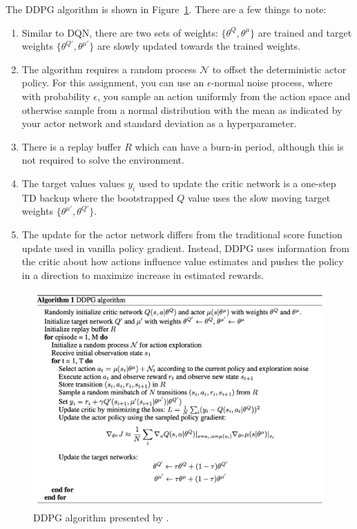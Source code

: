 \documentclass[12pt]{article}
\begin{document}
The DDPG algorithm is shown in Figure~\ref{fig:ddpg}.
There are a few things to note:
\begin{enumerate}
    \item Similar to DQN, there are two sets of weights: $\{\theta^{Q},\theta^\mu\}$ are trained and target weights $\{\theta^{Q'}, \theta^{\mu'}\}$ are slowly updated towards the trained weights.  
    \item The algorithm requires a random process $\mathcal{N}$ to offset the deterministic actor policy.  For this assignment, you can use an $\epsilon$-normal noise process, where with probability $\epsilon$, you sample an action uniformly from the action space and otherwise sample from a normal distribution with the mean as indicated by your actor network and standard deviation as a hyperparameter.  
    \item There is a replay buffer $R$ which can have a burn-in period, although this is not required to solve the environment.
    \item The target values values $y_i$ used to update the critic network is a one-step TD backup where the bootstrapped $Q$ value uses the slow moving target weights $\{\theta^{\mu'},\theta^{Q'}\}$.
    \item The update for the actor network differs from the traditional score function update used in vanilla policy gradient.  Instead, DDPG uses information from the critic about how actions influence value estimates and pushes the policy in a direction to maximize increase in estimated rewards.  
\end{enumerate}

\begin{figure}[h]
    \centering
    \includegraphics[width=1\textwidth]{ddpg}
    \caption{DDPG algorithm presented by \cite{DBLP:journals/corr/LillicrapHPHETS15}.}
    \label{fig:ddpg}
\end{figure}
\end{document}
